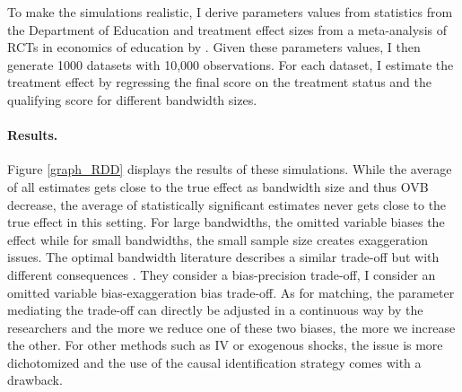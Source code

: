 \documentclass[usletter, 12pt]{article}
\begin{document}
        			To make the simulations realistic, I derive parameters values from statistics from the Department of Education and treatment effect sizes from a meta-analysis of RCTs in economics of education by \cite{kraft_interpreting_2020}.  Given these parameters values, I then generate 1000 datasets with 10,000 observations. For each dataset, I estimate the treatment effect by regressing the final score on the treatment status and the qualifying score for different bandwidth sizes. 
				
			\paragraph{Results.}  Figure \ref{graph_RDD} displays the results of these simulations. While the average of all estimates gets close to the true effect as bandwidth size and thus OVB decrease, the average of statistically significant estimates never gets close to the true effect in this setting. For large bandwidths, the omitted variable biases the effect while for small bandwidths, the small sample size creates exaggeration issues. The optimal bandwidth literature describes a similar trade-off but with different consequences \citep{imbens_optimal_2012}. They consider a bias-precision trade-off, I consider an omitted variable bias-exaggeration bias trade-off. As for matching, the parameter mediating the trade-off can directly be adjusted in a continuous way by the researchers and the more we reduce one of these two biases, the more we increase the other. For other methods such as IV or exogenous shocks, the issue is more dichotomized and the use of the causal identification strategy comes with a drawback.
        
\end{document}
